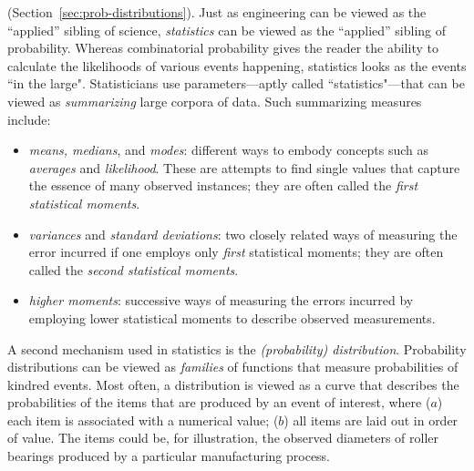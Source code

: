 \medskip



 (Section~\ref{sec:prob-distributions}).
Just as engineering can be viewed as the ``applied'' sibling of science, {\it statistics} can be viewed as the ``applied'' sibling of probability.  Whereas combinatorial probability gives the reader the ability to calculate the likelihoods of various events happening, statistics looks as the events ``in the large".  Statisticians use parameters---aptly called ``statistics"---that can be viewed as {\em summarizing} large corpora of data.  Such summarizing measures include:
\begin{itemize}
\item
{\em means, medians}, and {\em modes}: different ways to embody concepts such as {\em averages} and {\em likelihood}.  These are attempts to find single values that capture the essence of many observed instances; they are often called the {\it first statistical moments}.
 
\medskip\item
{\em variances} and {\em standard deviations}: two closely related ways of measuring the error incurred if one employs only {\em first} statistical moments; they are often called the {\it second statistical moments}.
\medskip\item
{\em higher moments}: successive ways of measuring the errors incurred by employing lower statistical moments to describe observed measurements.
\end{itemize}
A second mechanism used in statistics is the {\em (probability) distribution}.  Probability distributions can be viewed as {\em families} of functions that measure probabilities of kindred events.  Most often, a distribution is viewed as a curve that describes the probabilities of the items that are produced by an event of interest, where ($a$) each item is associated with a numerical value; ($b$) all items are laid out in order of value.  The items could be, for illustration, the observed diameters of roller bearings produced by a particular manufacturing process.

